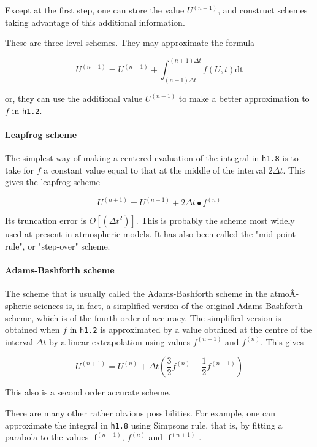 Except at the first step, one can store the value
\(U^{\left( n - 1 \right)}\), and construct schemes taking advantage of
this additional information.

These are three level schemes. They may approximate the formula

{\[U^{( n + 1 )} = U^{( n - 1 )} + \int_{( n - 1 )\Delta t}^{( n + 1 )\Delta t}f\left( U,t \right)\text{dt}\]}

or, they can use the additional value \(U^{\left( n - 1 \right)}\) to
make a better approximation to \(f\) in \texttt{h1.2}.

\paragraph{Leapfrog scheme}\label{leapfrog-scheme}

The simplest way of making a centered evaluation of the integral in
\texttt{h1.8} is to take for \(f\) a constant value equal to that at the
middle of the interval \(2\Delta t\). This gives the leapfrog scheme

{\[U^{\left( n + 1 \right)} = U^{\left( n - 1 \right)} + 2\Delta t \bullet f^{\left( n \right)}\]}

Its truncation error is
\( O\left\lbrack \left( {\Delta t}^{2} \right) \right\rbrack\). This is
probably the scheme most widely used at present in atmospheric models.
It has also been called the "mid-point rule", or "step-over" scheme.

\paragraph{Adams-Bashforth scheme}\label{adams-bashforth-scheme}

The scheme that is usually called the Adams-Bashforth scheme in the
atmoÂ­spheric sciences is, in fact, a simplified version of the original
Adams-Bashforth scheme, which is of the fourth order of accuracy. The
simplified version is obtained when \(f\) in \texttt{h1.2} is
approximated by a value obtained at the centre of the interval
\(\Delta t\) by a linear extrapolation using values
\(f^{\left( n - 1 \right)}\) and \(f^{\left( n \right)}\). This gives

{\[U^{\left( n + 1 \right)} = U^{\left( n \right)} + \Delta t\left( \frac{3}{2}f^{\left( n \right)} - \frac{1}{2}f^{\left( n - 1 \right)} \right)\]}

This also is a second order accurate scheme.

There are many other rather obvious possibilities. For example, one can
approximate the integral in \texttt{h1.8} using
Simpson\textquotesingle s rule, that is, by fitting a parabola to the
values \(\text{ f}^{\left( n - 1 \right)}\), \(f^{\left( n \right)}\)
and \(\text{ f}^{\left( n + 1 \right)}\) .


